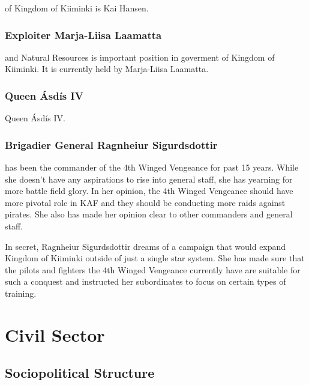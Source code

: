 \documentclass{tufte-book}
\begin{document}
 of Kingdom of Kiiminki is Kai Hansen.

\subsection{Exploiter Marja-Liisa Laamatta}
\label{sc:bio-marja-liisa-laamatta}

 and Natural Resources is important position in
goverment of Kingdom of Kiiminki. It is currently held by Marja-Liisa Laamatta.

\subsection{Queen \'{A}sd\'{i}s IV}
\label{sc:bio-asdis}

 Queen \'{A}sd\'{i}s IV.

\subsection{Brigadier General Ragnhei\dh ur Sigurdsdottir}
\label{sc:bio-ragnheidur sigurdsdottir}

 has been the commander of the 4th
Winged Vengeance for past 15 years. While she doesn't have any aspirations to
rise into general staff, she has yearning for more battle field glory. In her
opinion, the 4th Winged Vengeance should have more pivotal role in KAF and
they should be conducting more raids against pirates. She also has made her
opinion clear to other commanders and general staff.

In secret, Ragnhei\dh ur Sigurdsdottir dreams of a campaign that would expand
Kingdom of Kiiminki outside of just a single star system. She has made sure
that the pilots and fighters the 4th Winged Vengeance currently have are
suitable for such a conquest and instructed her subordinates to focus on
certain types of training.

\chapter{Civil Sector}
\label{ch:civil-sector}

\section{Sociopolitical Structure}
\label{sc:sociopolitical-structure}
\end{document}
